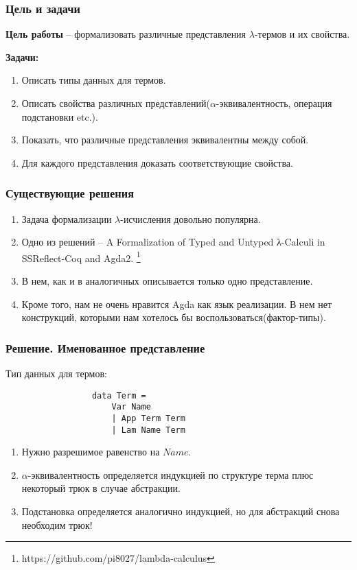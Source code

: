 \documentclass{beamer}
\begin{document}
\begin{frame}\frametitle{Цель и задачи}
    \textbf{Цель работы} -- формализовать различные представления $\lambda$-термов и их свойства.
    
    \bigskip
    
    \textbf{Задачи:}
    \begin{enumerate}
        \item Описать типы данных для термов.
        \item Описать свойства различных представлений($\alpha$-эквивалентность, операция подстановки etc.).
        \item Показать, что различные представления эквивалентны между собой.
        \item Для каждого представления доказать соответствующие свойства.
    \end{enumerate}
\end{frame}

\begin{frame}\frametitle{Существующие решения}
    \begin{enumerate}
        \item Задача формализации $\lambda$-исчисления довольно популярна.
        \item Одно из решений -- A Formalization of Typed and Untyped λ-Calculi in SSReflect-Coq and Agda2. \footnote{https://github.com/pi8027/lambda-calculus}
        \item В нем, как и в аналогичных описывается только одно представление.
        \item Кроме того, нам не очень нравится Agda как язык реализации. В нем нет конструкций, которыми нам хотелось бы воспользоваться(фактор-типы).
    \end{enumerate}
\end{frame}

\begin{frame}[fragile=singleslide]\frametitle{Решение. Именованное представление}
    Тип данных для термов:
        \begin{figure}[H]
            \center
            \begin{verbatim}
            data Term =
                Var Name 
                | App Term Term 
                | Lam Name Term
            \end{verbatim}
        \end{figure}
    \begin{enumerate}
        \item Нужно разрешимое равенство на $Name$.
        \item $\alpha$-эквивалентность определяется индукцией по структуре терма плюс некоторый трюк в случае абстракции.
        \item Подстановка определяется аналогично индукцией, но для абстракций снова необходим трюк!
    \end{enumerate}
\end{frame}
\end{document}
